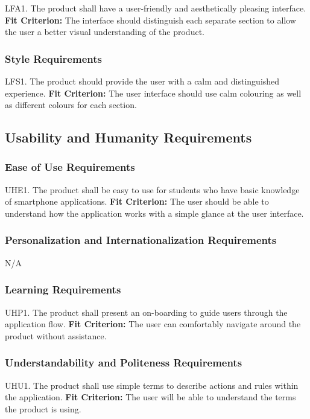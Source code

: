 \documentclass[12pt, titlepage]{article}
\begin{document}
LFA1. The product shall have a user-friendly and aesthetically pleasing interface.
	\textbf{Fit Criterion:} The interface should distinguish each separate section to allow the user a 
better visual understanding of the product.

\subsubsection{Style Requirements}

LFS1. The product should provide the user with a calm and distinguished experience.
	\textbf{Fit Criterion:} The user interface should use calm colouring as well as different colours 
for each section.

\subsection{Usability and Humanity Requirements}

\subsubsection{Ease of Use Requirements}

UHE1. The product shall be easy to use for students who have basic knowledge of smartphone applications.
	\textbf{Fit Criterion:} The user should be able to understand how the application works with a 
simple glance at the user interface.

\subsubsection{Personalization and Internationalization Requirements}

N/A

\subsubsection{Learning Requirements}

UHP1. The product shall present an on-boarding to guide users through the application flow.
  \textbf{Fit Criterion:} The user can comfortably navigate around the product without assistance. 

\subsubsection{Understandability and Politeness Requirements}

UHU1. The product shall use simple terms to describe actions and rules within the application.
	\textbf{Fit Criterion:} The user will be able to understand the terms the product is using.
\end{document}
